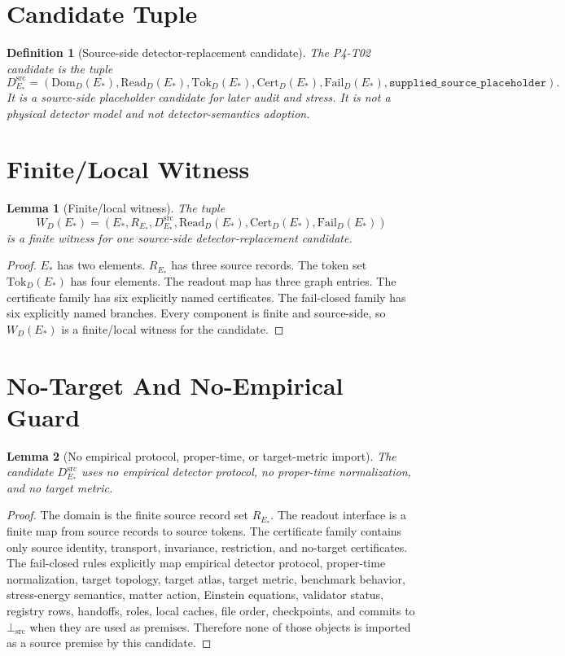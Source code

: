 \documentclass[11pt]{article}
\newcommand{\EStar}{E_{\ast}}
\newcommand{\RStar}{R_{E_{\ast}}}
\newcommand{\DSrc}{D^{\mathrm{src}}_{E_{\ast}}}
\newcommand{\DomD}{\mathrm{Dom}_{D}(E_{\ast})}
\newcommand{\ReadD}{\mathrm{Read}_{D}(E_{\ast})}
\newcommand{\TokD}{\mathrm{Tok}_{D}(E_{\ast})}
\newcommand{\CertD}{\mathrm{Cert}_{D}(E_{\ast})}
\newcommand{\FailD}{\mathrm{Fail}_{D}(E_{\ast})}
\newcommand{\BottomSrc}{\bot_{\mathrm{src}}}
\newtheorem{definition}{Definition}
\newtheorem{lemma}{Lemma}
\begin{document}
\section{Candidate Tuple}

\begin{definition}[Source-side detector-replacement candidate]
The P4-T02 candidate is the tuple
\[
  \DSrc=(\DomD,\ReadD,\TokD,\CertD,\FailD,
  \texttt{supplied\_source\_placeholder}).
\]
It is a source-side placeholder candidate for later audit and stress. It is
not a physical detector model and not detector-semantics adoption.
\end{definition}

\section{Finite/Local Witness}

\begin{lemma}[Finite/local witness]
The tuple
\[
  W_D(\EStar)=(\EStar,\RStar,\DSrc,\ReadD,\CertD,\FailD)
\]
is a finite witness for one source-side detector-replacement candidate.
\end{lemma}

\begin{proof}
\(\EStar\) has two elements. \(\RStar\) has three source records. The token
set \(\TokD\) has four elements. The readout map has three graph entries. The
certificate family has six explicitly named certificates. The fail-closed
family has six explicitly named branches. Every component is finite and
source-side, so \(W_D(\EStar)\) is a finite/local witness for the candidate.
\end{proof}

\section{No-Target And No-Empirical Guard}

\begin{lemma}[No empirical protocol, proper-time, or target-metric import]
The candidate \(\DSrc\) uses no empirical detector protocol, no proper-time
normalization, and no target metric.
\end{lemma}

\begin{proof}
The domain is the finite source record set \(\RStar\). The readout interface
is a finite map from source records to source tokens. The certificate family
contains only source identity, transport, invariance, restriction, and
no-target certificates. The fail-closed rules explicitly map empirical
detector protocol, proper-time normalization, target topology, target atlas,
target metric, benchmark behavior, stress-energy semantics, matter action,
Einstein equations, validator status, registry rows, handoffs, roles, local
caches, file order, checkpoints, and commits to \(\BottomSrc\) when they are
used as premises. Therefore none of those objects is imported as a source
premise by this candidate.
\end{proof}
\end{document}

